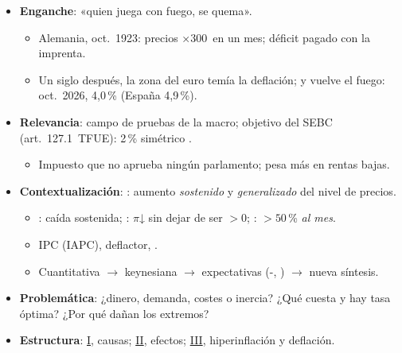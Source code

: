 \documentclass{article}
\begin{document}
\cabecerarepaso
\begin{columnas}

\begin{itemize}
\item \textbf{Enganche}: «quien juega con fuego, se quema».
  \begin{itemize}
  \item Alemania, oct.\ 1923: precios ×300~en un mes; déficit pagado con la imprenta.
  \item Un siglo después, la zona del euro temía la deflación; y vuelve el fuego: oct.\ 2026, 4,0\,\% (España 4,9\,\%).
  \end{itemize}
\item \textbf{Relevancia}: campo de pruebas de la macro; objetivo del SEBC (art.~127.1~TFUE): 2\,\% simétrico .
  \begin{itemize}
  \item Impuesto que no aprueba ningún parlamento; pesa más en rentas bajas.
  \end{itemize}
\item \textbf{Contextualización}: : aumento \emph{sostenido} y \emph{generalizado} del nivel de precios.
  \begin{itemize}
  \item {}: caída sostenida; : $\pi$↓ sin dejar de ser $>0$; : $>50$\,\% \emph{al mes}.
  \item IPC (IAPC), deflactor,  .
  \item Cuantitativa  $\to$ keynesiana  $\to$ expectativas (-, ) $\to$ nueva síntesis.
  \end{itemize}
\item \textbf{Problemática}: ¿dinero, demanda, costes o inercia? ¿Qué cuesta y hay tasa óptima? ¿Por qué dañan los extremos?
\item \textbf{Estructura}: \hyperref[rep:I]{I}, causas; \hyperref[rep:II]{II}, efectos; \hyperref[rep:III]{III}, hiperinflación y deflación.
\end{itemize}


\end{columnas}
\end{document}
